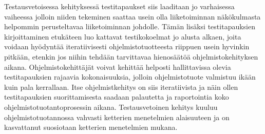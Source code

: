   Testausvetoisessa kehityksessä testitapaukset siis laaditaan jo varhaisessa vaiheessa jolloin niiden tekeminen saattaa usein olla liiketoiminnan näkökulmasta helpommin perusteltavaa liiketoiminnan johdolle.
  Tämän lisäksi testitapauksien kirjoittaminen etukäteen luo kattavat testikokoelmat jo alusta alkaen, joita voidaan hyödyntää iteratiivisesti ohjelmistotuotteesta riippuen usein hyvinkin pitkään, etenkin jos niihin tehdään tarvittavaa hienosäätöä ohjelmistokehityksen aikana.
  Ohjelmistokehittäjät voivat kehittää helposti hallittavissa olevia testitapauksien rajaavia kokonaisuuksia, jolloin ohjelmistotuote valmistuu ikään kuin pala kerrallaan.
  Itse ohjelmistkehitys on siis iteratiivista ja näin ollen testitapauksien suorittamisesta saadaan palautetta ja raportointia koko ohjelmistotuotantoprosessin aikana.
  Testausvetoinen kehitys kuuluu ohjelmistotuotannossa vahvasti ketterien menetelmien alaisuuteen ja on kasvattanut suosiotaan ketterien menetelmien mukana.
